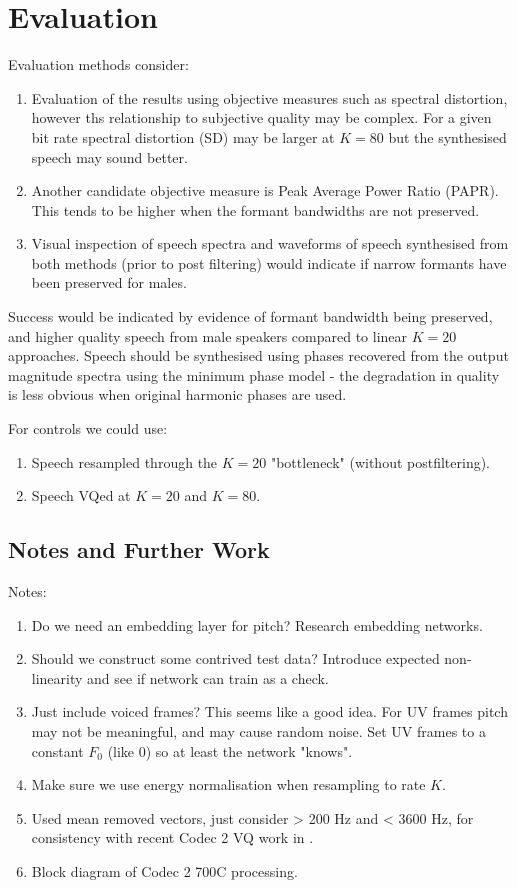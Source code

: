 \documentclass{article}
\begin{document}
\section{Evaluation}

Evaluation methods consider:
\begin{enumerate}
\item Evaluation of the results using objective measures such as spectral distortion, however ths relationship to subjective quality may be complex.  For a given bit rate spectral distortion (SD) may be larger at $K=80$ but the synthesised speech may sound better.
\item Another candidate objective measure is Peak Average Power Ratio (PAPR). This tends to be higher when the formant bandwidths are not preserved.
\item Visual inspection of speech spectra and waveforms of speech synthesised from both methods (prior to post filtering) would indicate if narrow formants have been preserved for males.
\end{enumerate}
	
Success would be indicated by evidence of formant bandwidth being preserved, and higher quality speech from male speakers compared to linear $K=20$ approaches. Speech should be synthesised using phases recovered from the output magnitude spectra using the minimum phase model - the degradation in quality is less obvious when original harmonic phases are used. 

For controls we could use:
\begin{enumerate}
\item Speech resampled through the $K=20$ "bottleneck" (without postfiltering).
\item Speech VQed at $K=20$ and $K=80$. 
\end{enumerate}

\subsection{Notes and Further Work}

Notes:
\begin{enumerate}
\item Do we need an embedding layer for pitch?  Research embedding networks.
\item Should we construct some contrived test data?  Introduce expected non-linearity and see if network can train as a check.
\item Just include voiced frames?  This seems like a good idea.  For UV frames pitch may not be meaningful, and may cause random noise. Set UV frames to a constant $F_0$ (like 0) so at least the network "knows".
\item Make sure we use energy normalisation \cite{rowe2023_ratek_study} when resampling to rate $K$.
\item Used mean removed vectors, just consider > 200 Hz and < 3600 Hz, for consistency with recent Codec 2 VQ work in \cite{rowe2023_ratek_study}.
\item Block diagram of Codec 2 700C processing.
\end{enumerate}
\end{document}
